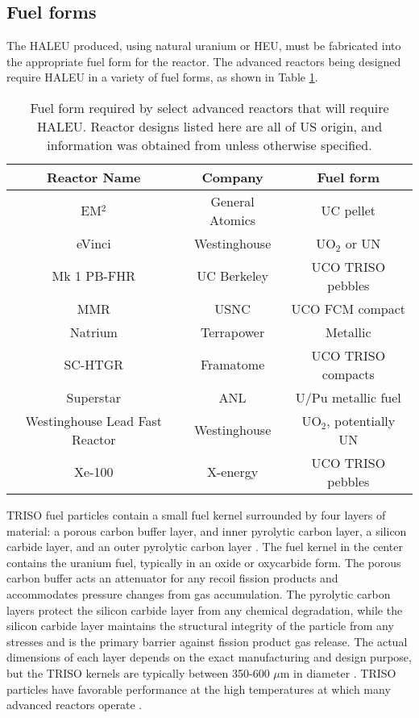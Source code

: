 \subsection{Fuel forms}
The \gls{HALEU} produced, using natural uranium or \gls{HEU}, must be 
fabricated into the appropriate fuel form for the reactor.
The advanced reactors being designed require \gls{HALEU} in a 
variety of fuel forms, as shown in Table \ref{tab:fuel_forms}.  

\begin{table}[ht]
    \centering
    \caption{Fuel form required by select advanced reactors that will 
    require \gls{HALEU}. Reactor designs listed here are all of US origin, 
    and information was obtained from \cite{hussain_advances_2018} unless 
    otherwise specified.}
    \label{tab:fuel_forms}
    \begin{tabular}{c c c}
        \hline
        Reactor Name & Company & Fuel form \\\hline 
        EM$^2$ & General Atomics & UC pellet \\
        eVinci & Westinghouse & UO$_2$ or UN \\
        Mk 1 PB-FHR & UC Berkeley & UCO TRISO pebbles\\
        \gls{MMR} \cite{mitchell_usnc_2020} & \gls{USNC} & UCO FCM compact\\
        Natrium & Terrapower & Metallic \\
        SC-HTGR & Framatome & UCO TRISO compacts \\
        Superstar  & \gls{ANL} & U/Pu metallic fuel \\
        Westinghouse Lead Fast Reactor  & Westinghouse & UO$_2$, potentially UN \\
        Xe-100 \cite{harlan_x-energy_2018} & X-energy & UCO TRISO pebbles \\
        \hline        
        
    \end{tabular}
\end{table}

\gls{TRISO} fuel particles contain 
a small fuel kernel surrounded by four layers of material: a porous carbon 
buffer layer, and inner pyrolytic carbon layer, a silicon carbide layer, 
and an outer pyrolytic carbon layer \cite{demkowicz_coated_2019}. The fuel 
kernel in the center contains the uranium fuel, typically in an oxide 
or oxycarbide form. The porous carbon buffer acts an attenuator for any 
recoil fission products and accommodates pressure changes from gas 
accumulation.
The pyrolytic carbon layers protect the silicon carbide layer from 
any chemical degradation, while the silicon carbide layer maintains the 
structural integrity of the particle from any stresses and is the primary 
barrier against fission product gas release. The actual dimensions 
of each layer depends on the exact manufacturing and design purpose, but 
the \gls{TRISO} kernels are typically between 350-600 $\mu$m in diameter 
\cite{demkowicz_coated_2019}. \gls{TRISO} particles have 
favorable performance at the high temperatures 
at which many advanced reactors operate \cite{demkowicz_coated_2019}. 

